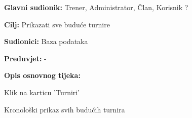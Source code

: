 					\noindent {}
					\begin{packed_item}
	
						\item \textbf{Glavni sudionik: }Trener, Administrator, Član, Korisnik ?
						\item  \textbf{Cilj: } Prikazati sve buduće turnire
						\item  \textbf{Sudionici: } Baza podataka
						\item  \textbf{Preduvjet: } -
						\item  \textbf{Opis osnovnog tijeka:}
						
						\item[] \begin{packed_enum}
	
							\item Klik na karticu 'Turniri'
							\item Kronološki prikaz svih budućih turnira
						\end{packed_enum}
					\end{packed_item}
					

